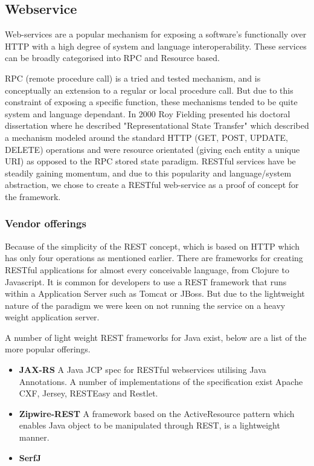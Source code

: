 \documentclass[pdftex,11pt,a4paper]{article}
\begin{document}
\subsection{Webservice}

Web-services are a popular mechanism for exposing a software's functionally over HTTP with a high degree of system and language interoperability. These services can be broadly categorised into RPC and Resource based.

RPC (remote procedure call) is a tried and tested mechanism, and is conceptually an extension to a regular or local procedure call. But due to this constraint of exposing a specific function, these mechanisms tended to be quite system and language dependant. In 2000 Roy Fielding presented his doctoral dissertation where he described "Representational State Transfer"\cite{REST} which described a mechanism modeled around the standard HTTP (GET, POST, UPDATE, DELETE) operations and were resource orientated (giving each entity a unique URI) as opposed to the RPC stored state paradigm. RESTful services have be steadily gaining momentum, and due to this popularity and language/system abstraction, we chose to create a RESTful web-service as a proof of concept for the framework.

\subsubsection{Vendor offerings}
Because of the simplicity of the REST concept, which is based on HTTP which has only four operations as mentioned earlier. There are frameworks for creating RESTful applications for almost every conceivable language, from Clojure\cite{website:compojure-rest} to Javascript\cite{website:persevere}. It is common for developers to use a REST framework that runs within a Application Server such as Tomcat\cite{website:tomcat} or JBoss\cite{website:jboss}. But due to the lightweight nature of the paradigm we were keen on not running the service on a heavy weight application server.

A number of light weight REST frameworks for Java exist, below are a list of the more popular offerings.

\begin{itemize}
	\item \textbf{JAX-RS} A Java JCP spec for RESTful webservices utilising Java Annotations. A number of implementations of the specification exist Apache CXF, Jersey, RESTEasy and Restlet.
	\item \textbf{Zipwire-REST} A framework based on the ActiveResource pattern which enables Java object to be manipulated through REST, is a lightweight manner.
	\item \textbf{SerfJ}
\end{itemize}
\end{document}
